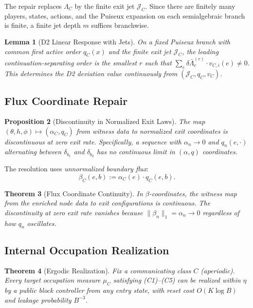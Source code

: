 \documentclass[12pt,a4paper]{article}
\newtheorem{theorem}{Theorem}[section]
\newtheorem{proposition}[theorem]{Proposition}
\newtheorem{lemma}[theorem]{Lemma}
\theoremstyle{definition}
\newcommand{\cJ}{\mathcal{J}}
\begin{document}
The repair replaces $\Lambda_C$ by the finite exit jet $\cJ_C$. Since there are finitely many players, states, actions, and the Puiseux expansion on each semialgebraic branch is finite, a finite jet depth $m$ suffices branchwise.

\begin{lemma}[D2 Linear Response with Jets]
\label{lem:d2-jets}
On a fixed Puiseux branch with common first active order $q_C(x)$ and the finite exit jet $\cJ_C$, the leading continuation-separating order is the smallest $r$ such that $\sum_e \delta \bar\Lambda_e^{(r)} \cdot v_{C,i}(e) \neq 0$. This determines the D2 deviation value continuously from $(\cJ_C, q_C, v_C)$.
\end{lemma}

\subsection{Flux Coordinate Repair}
\label{sec:flux-repair}

\begin{proposition}[Discontinuity in Normalized Exit Laws]
\label{prop:flux-discontinuity}
The map $(\theta, h, \phi) \mapsto (\alpha_C, q_C)$ from witness data to normalized exit coordinates is discontinuous at zero exit rate. Specifically, a sequence with $\alpha_n \to 0$ and $q_n(e, \cdot)$ alternating between $\delta_{b_1}$ and $\delta_{b_2}$ has no continuous limit in $(\alpha, q)$ coordinates.
\end{proposition}

The resolution uses \emph{unnormalized boundary flux}:
\[
\beta_C(e, b) := \alpha_C(e) \cdot q_C(e, b).
\]

\begin{theorem}[Flux Coordinate Continuity]
\label{thm:flux-continuity}
In $\beta$-coordinates, the witness map from the enriched node data to exit configurations is continuous. The discontinuity at zero exit rate vanishes because $\|\beta_n\|_1 = \alpha_n \to 0$ regardless of how $q_n$ oscillates.
\end{theorem}

\subsection{Internal Occupation Realization}
\label{sec:realization}

\begin{theorem}[Ergodic Realization]
\label{thm:ergodic-realization}
Fix a communicating class $C$ (aperiodic). Every target occupation measure $\mu_C$ satisfying (C1)--(C5) can be realized within $\eta$ by a public block controller from any entry state, with reset cost $O(K \log B)$ and leakage probability $B^{-3}$.
\end{theorem}
\end{document}
